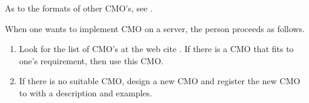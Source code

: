 As to the formats of other CMO's, see \cite{noro-takayama}.

When one wants to implement CMO on a server, the person proceeds 
as follows.
\begin{enumerate}
\item Look for the list of CMO's at the web cite \cite{openxm-web}.
If there is a CMO that fits to one's requirement, then use this CMO.     
\item If there is no suitable CMO, design a new CMO and register 
the new CMO to \cite{openxm-web} with a description and examples.
\end{enumerate}

